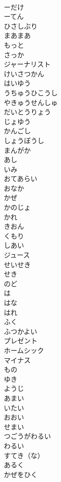 \documentclass[8pt]{extreport}
\begin{document}
\begin{CJK}{UTF8}{min}
\\	ーだけ	
\\	ーてん	
\\	ひさしぶり	
\\	まあまあ	
\\	もっと	
\\	さっか	
\\	ジャーナリスト	
\\	けいさつかん	
\\	はいゆう	
\\	うちゅうひこうし	
\\	やきゅうせんしゅ	
\\	だいとうりょう	
\\	じょゆう	
\\	かんごし	
\\	しょうぼうし	
\\	まんがか	
\\	あし	
\\	いみ	
\\	おてあらい	
\\	おなか	
\\	かぜ	
\\	かのじょ	
\\	かれ	
\\	きおん	
\\	くもり	
\\	しあい	
\\	ジュース	
\\	せいせき	
\\	せき	
\\	のど	
\\	は	
\\	はな	
\\	はれ	
\\	ふく	
\\	ふつかよい	
\\	プレゼント	
\\	ホームシック	
\\	マイナス	
\\	もの	
\\	ゆき	
\\	ようじ	
\\	あまい	
\\	いたい	
\\	おおい	
\\	せまい	
\\	つごうがわるい	
\\	わるい	
\\	すてき（な）	
\\	あるく	
\\	かぜをひく	

\end{CJK}
\end{document}
